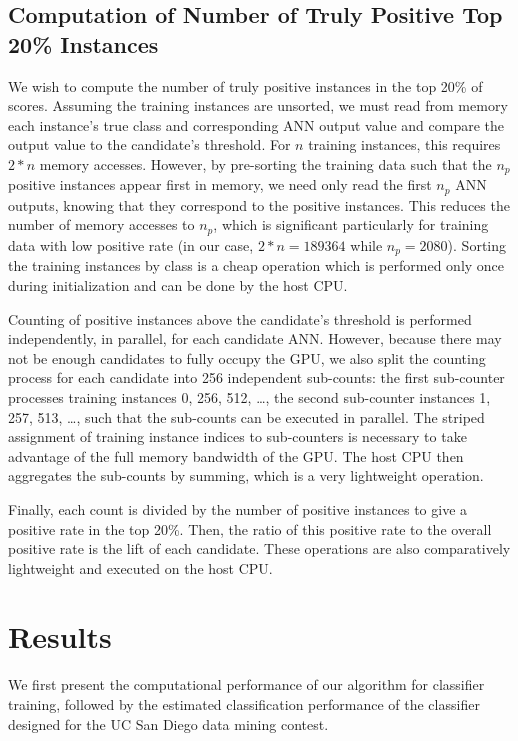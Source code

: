 \documentclass[letterpaper]{jpconf}       %
\begin{document}
\subsection{Computation of Number of Truly Positive Top 20\% Instances} \label{truepos}
We wish to compute the number of truly positive instances in the top 20\% of scores. Assuming the training instances are unsorted, we must read from memory each instance's true class and corresponding ANN output value and compare the output value to the candidate's threshold. For $n$ training instances, this requires $2 * n$ memory accesses. However, by pre-sorting the training data such that the $n_p$ positive instances appear first in memory, we need only read the first $n_p$ ANN outputs, knowing that they correspond to the positive instances. This reduces the number of memory accesses to $n_p$, which is significant particularly for training data with low positive rate (in our case, $2 * n = 189364$ while $n_p = 2080$). Sorting the training instances by class is a cheap operation which is performed only once during initialization and can be done by the host CPU.

Counting of positive instances above the candidate's threshold is performed independently, in parallel, for each candidate ANN. However, because there may not be enough candidates to fully occupy the GPU, we also split the counting process for each candidate into 256 independent sub-counts: the first sub-counter processes training instances 0, 256, 512, \ldots, the second sub-counter instances 1, 257, 513, \ldots, such that the sub-counts can be executed in parallel. The striped assignment of training instance indices to sub-counters is necessary to take advantage of the full memory bandwidth of the GPU. The host CPU then aggregates the sub-counts by summing, which is a very lightweight operation.

Finally, each count is divided by the number of positive instances to give a positive rate in the top 20\%. Then, the ratio of this positive rate to the overall positive rate is the lift of each candidate. These operations are also comparatively lightweight and executed on the host CPU.

\section{Results} \label{results}
We first present the computational performance of our algorithm for classifier training, followed by the estimated classification performance of the classifier designed for the UC San Diego data mining contest.
\end{document}
